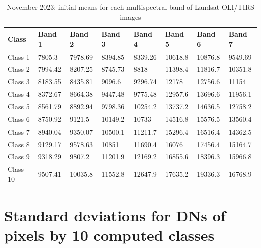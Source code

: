 \documentclass[geomatics,article,submit,pdftex,moreauthors]{Definitions/mdpi}
\begin{document}
\begin{table}[H]
\centering
\begin{tabularx}{\textwidth}{| p{1.5cm} | X | X | X | X | X | X | X | }
  \toprule
   Class & Band 1 & Band 2 & Band 3 & Band 4 & Band 5 & Band 6 & Band 7  \\
   \midrule
    Class 1 & 7805.3 & 7978.69 & 8394.85 & 8339.26 & 10618.8 & 10876.8 & 9549.69 \\
    Class 2 & 7994.42 & 8207.25 & 8745.73 & 8818 & 11398.4 & 11816.7 & 10351.8 \\
    Class 3 & 8183.55 & 8435.81 & 9096.6 & 9296.74 & 12178 & 12756.6 & 11154 \\
    Class 4 & 8372.67 & 8664.38 & 9447.48 & 9775.48 & 12957.6 & 13696.6 & 11956.1 \\
    Class 5 & 8561.79 & 8892.94 & 9798.36 & 10254.2 & 13737.2 & 14636.5 & 12758.2 \\
    Class 6 & 8750.92 & 9121.5 & 10149.2 & 10733 & 14516.8 & 15576.5 & 13560.4 \\
    Class 7 & 8940.04 & 9350.07 & 10500.1 & 11211.7 & 15296.4 & 16516.4 & 14362.5 \\
    Class 8 & 9129.17 & 9578.63 & 10851 & 11690.4 & 16076 & 17456.4 & 15164.7 \\
    Class 9 & 9318.29 & 9807.2 & 11201.9 & 12169.2 & 16855.6 & 18396.3 & 15966.8 \\
    Class 10 & 9507.41 & 10035.8 & 11552.8 & 12647.9 & 17635.2 & 19336.3 & 16768.9 \\
    \bottomrule
\end{tabularx}
\caption{November 2023: initial means for each multispectral band of Landsat OLI/TIRS images}\label{tabA06}
\end{table}

\section[\appendixname~\thesection]{Standard deviations for DNs of pixels by 10 computed classes}
\end{document}
